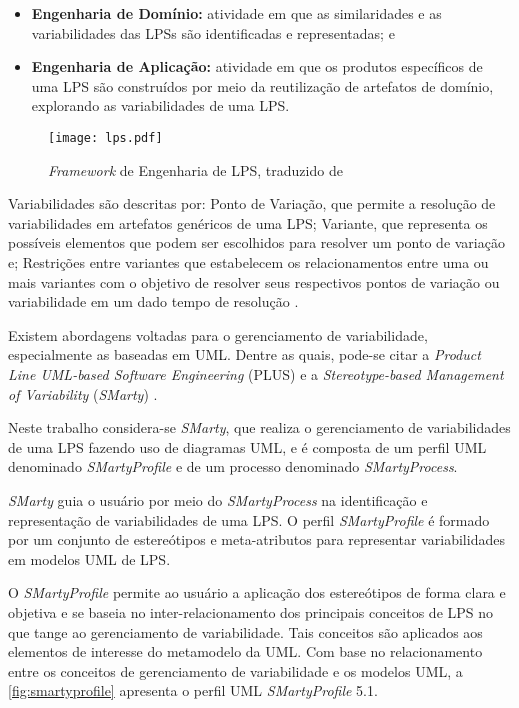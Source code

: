 \begin{itemize}
	\item \textbf{Engenharia de Domínio:} atividade em que as similaridades e as variabilidades das LPSs são identificadas e representadas; e 
	\item \textbf{Engenharia de Aplicação:} atividade em que os produtos específicos de uma LPS são construídos por meio da reutilização de artefatos de domínio, explorando as variabilidades de uma LPS.
\end{itemize}


\begin{figure}[h]
	\centering
	\texttt{[image: lps.pdf]}
	\caption{\textit{Framework} de Engenharia de LPS, traduzido de \citet{pohl2005software}}
	\label{fig:lps}
\end{figure}

Variabilidades são descritas por: Ponto de Variação, que permite a resolução de variabilidades em artefatos genéricos de uma LPS; Variante, que representa os possíveis elementos que podem ser escolhidos para resolver um ponto de variação e; Restrições entre variantes que estabelecem os relacionamentos entre uma ou mais variantes com o objetivo de resolver seus respectivos pontos de variação ou variabilidade em um dado tempo de resolução \cite{linden2007product, pohl2005software, apel2016feature}.

Existem abordagens voltadas para o gerenciamento de variabilidade, especialmente as baseadas em UML. Dentre as quais, pode-se citar a \textit{Product Line UML-based Software Engineering} (PLUS) \cite{gomaa2006designing} e a \textit{Stereotype-based Management of Variability} (\textit{SMarty}) \cite{junior2010systematic}.

Neste trabalho considera-se \textit{SMarty}, que realiza o gerenciamento de variabilidades de uma LPS fazendo uso de diagramas UML, e é composta de um perfil UML denominado \textit{SMartyProfile} e de um processo denominado \textit{SMartyProcess}. 

\textit{SMarty} guia o usuário por meio do \textit{SMartyProcess} na identificação e representação de variabilidades de uma LPS. O perfil \textit{SMartyProfile} é formado por um conjunto de estereótipos e meta-atributos para representar variabilidades em modelos UML de LPS.

O \textit{SMartyProfile} permite ao usuário a aplicação dos estereótipos de forma clara e objetiva \cite{junior2010systematic,junior2013systematic,fiori2012variability} e se baseia no inter-relacionamento dos principais conceitos de LPS no que tange ao gerenciamento de variabilidade. Tais conceitos são aplicados aos elementos de interesse do metamodelo da UML. Com base no relacionamento entre os conceitos de gerenciamento de variabilidade e os modelos UML, a \ref{fig:smartyprofile} apresenta o perfil UML \textit{SMartyProfile} 5.1.



